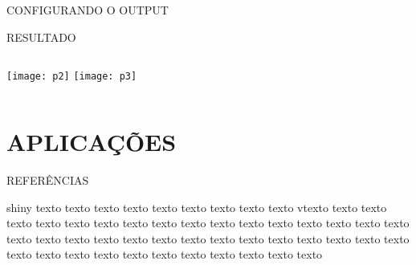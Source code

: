 \documentclass[
  ignorenonframetext,
]{beamer}
\newenvironment{Shaded}{\begin{snugshade}}{\end{snugshade}}
\newcommand{\DataTypeTok}[1]{\textcolor[rgb]{0.13,0.29,0.53}{#1}}
\newcommand{\KeywordTok}[1]{\textcolor[rgb]{0.13,0.29,0.53}{\textbf{#1}}}
\newcommand{\NormalTok}[1]{#1}
\newcommand{\StringTok}[1]{\textcolor[rgb]{0.31,0.60,0.02}{#1}}
\begin{document}
\begin{frame}[fragile]{CONFIGURANDO O OUTPUT}
\protect\hypertarget{configurando-o-output}{}


\begin{Shaded}
\end{Shaded}

\end{frame}

\begin{frame}{RESULTADO}
\protect\hypertarget{resultado-1}{}

\begin{columns}
  \centering
      \texttt{[image: p2]}
      \texttt{[image: p3]}
\end{columns}

\end{frame}

\hypertarget{aplicacoes}{%
\section{APLICAÇÕES}\label{aplicacoes}}

\begin{frame}{REFERÊNCIAS}
\protect\hypertarget{referencias}{}

shiny texto texto texto texto texto texto texto texto texto vtexto texto
texto texto texto texto texto texto texto texto texto texto texto texto
texto texto texto texto texto texto texto texto texto texto texto texto
texto texto texto texto texto texto texto texto texto texto texto texto
texto texto texto texto

\end{frame}
\end{document}
